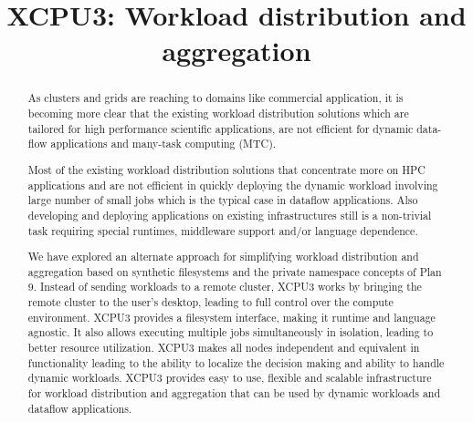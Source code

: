 \documentclass[conference]{IEEEtran}
\begin{document}
\title{XCPU3: Workload distribution and aggregation}


\author{
\and
{}
}

\maketitle

\begin{abstract}


As clusters and grids are reaching to domains like commercial application, it
is becoming more clear that the existing workload distribution solutions which
are tailored for high performance scientific applications, are not efficient
for dynamic data-flow applications and many-task computing (MTC).

Most of the existing workload distribution solutions that concentrate more on
HPC applications and are not efficient in quickly deploying the dynamic
workload involving large number of small jobs which is the typical case in
dataflow applications. Also developing and deploying applications on existing
infrastructures still is a non-trivial task requiring special runtimes,
middleware support and/or language dependence.

We have explored an alternate approach for simplifying workload
distribution and aggregation based on synthetic filesystems and the private
namespace concepts of Plan 9.  Instead of sending workloads to a remote
cluster, XCPU3 works by bringing the remote cluster to the user's desktop,
leading to full control over the compute environment.   XCPU3 provides
a filesystem interface, making it runtime and language agnostic.  It also
allows executing multiple jobs simultaneously in isolation, leading to
better resource utilization.  XCPU3 makes all nodes independent and
equivalent in functionality leading to the ability to localize the
decision making and ability to handle dynamic workloads.  XCPU3 provides easy to
use, flexible and scalable infrastructure for workload distribution and
aggregation that can be used by dynamic workloads and dataflow applications.

\end{abstract}
\end{document}
